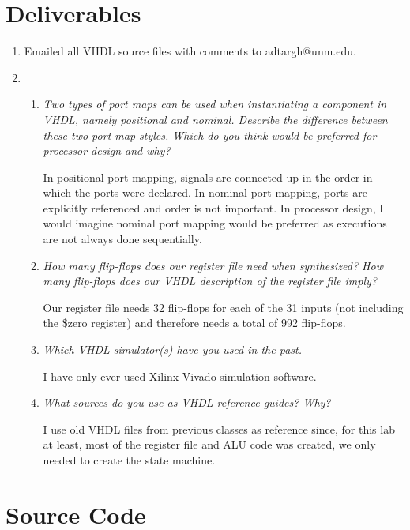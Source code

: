 \documentclass{article}
\begin{document}
\section*{Deliverables}
\begin{enumerate}

\item Emailed all VHDL source files with comments to adtargh@unm.edu.

\item
\begin{enumerate}
\item \textit{Two types of port maps can be used when instantiating a component in VHDL, namely positional and nominal.
Describe the difference between these two port map styles.
Which do you think would be preferred for processor design and why?}

In positional port mapping, signals are connected up in the order in which the ports were declared. In nominal port mapping, ports are explicitly referenced and order is not important. In processor design, I would imagine nominal port mapping would be preferred as executions are not always done sequentially.

\item \textit{How many flip-flops does our register file need when synthesized? How many flip-flops does our VHDL description of the register file imply?}

Our register file needs 32 flip-flops for each of the 31 inputs (not including the \$zero register) and therefore needs a total of 992 flip-flops.

\item \textit{Which VHDL simulator(s) have you used in the past.}

I have only ever used Xilinx Vivado simulation software.

\item \textit{What sources do you use as VHDL reference guides? Why?}

I use old VHDL files from previous classes as reference since, for this lab at least, most of the register file and ALU code was created, we only needed to create the state machine.

\end{enumerate}
\end{enumerate}

\newpage
\section*{Source Code}

\end{document}
